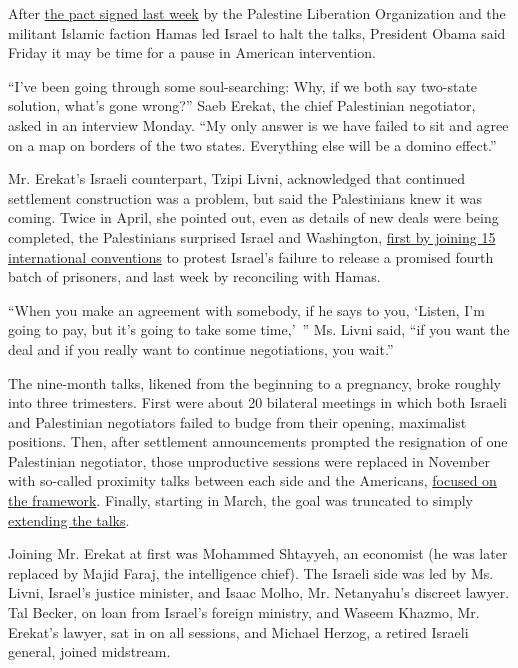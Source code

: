 After
\href{http://www.nytimes3xbfgragh.onion/2014/04/24/world/middleeast/palestinian-factions-announce-deal-on-unity-government.html?hpw\&rref=world}{the
pact signed last week} by the Palestine Liberation Organization and the
militant Islamic faction Hamas led Israel to halt the talks, President
Obama said Friday it may be time for a pause in American intervention.

``I've been going through some soul-searching: Why, if we both say
two-state solution, what's gone wrong?'' Saeb Erekat, the chief
Palestinian negotiator, asked in an interview Monday. ``My only answer
is we have failed to sit and agree on a map on borders of the two
states. Everything else will be a domino effect.''

Mr. Erekat's Israeli counterpart, Tzipi Livni, acknowledged that
continued settlement construction was a problem, but said the
Palestinians knew it was coming. Twice in April, she pointed out, even
as details of new deals were being completed, the Palestinians surprised
Israel and Washington,
\href{http://www.nytimes3xbfgragh.onion/2014/04/02/world/middleeast/jonathan-pollard.html}{first
by joining 15 international conventions} to protest Israel's failure to
release a promised fourth batch of prisoners, and last week by
reconciling with Hamas.

``When you make an agreement with somebody, if he says to you, `Listen,
I'm going to pay, but it's going to take some time,'~'' Ms. Livni said,
``if you want the deal and if you really want to continue negotiations,
you wait.''

The nine-month talks, likened from the beginning to a pregnancy, broke
roughly into three trimesters. First were about 20 bilateral meetings in
which both Israeli and Palestinian negotiators failed to budge from
their opening, maximalist positions. Then, after settlement
announcements prompted the resignation of one Palestinian negotiator,
those unproductive sessions were replaced in November with so-called
proximity talks between each side and the Americans,
\href{http://www.nytimes3xbfgragh.onion/2014/01/01/world/middleeast/kerry-to-press-for-framework-accord-to-keep-mideast-peace-effort-moving.html}{focused
on the framework}. Finally, starting in March, the goal was truncated to
simply
\href{http://www.nytimes3xbfgragh.onion/2014/04/05/world/middleeast/mideast.html}{extending
the talks}.

Joining Mr. Erekat at first was Mohammed Shtayyeh, an economist (he was
later replaced by Majid Faraj, the intelligence chief). The Israeli side
was led by Ms. Livni, Israel's justice minister, and Isaac Molho, Mr.
Netanyahu's discreet lawyer. Tal Becker, on loan from Israel's foreign
ministry, and Waseem Khazmo, Mr. Erekat's lawyer, sat in on all
sessions, and Michael Herzog, a retired Israeli general, joined
midstream.

